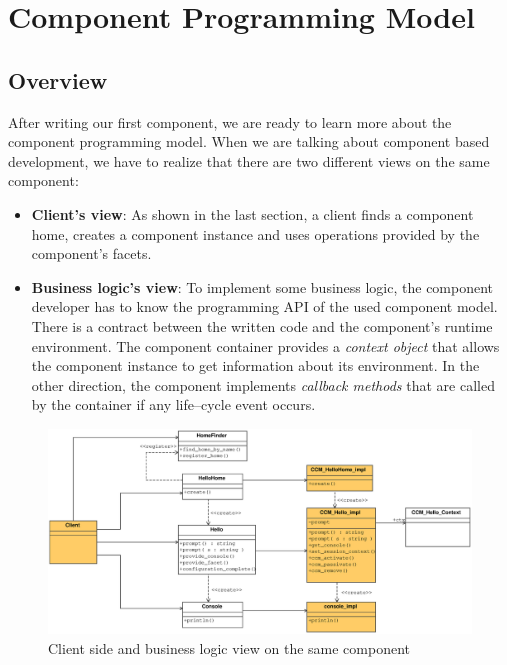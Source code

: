 
\chapter{Component Programming Model}

\section{Overview}

After writing our first component, we are ready to learn more about the 
component programming model.
When we are talking about component based development, we have to realize that there 
are two different views on the same component:
\begin{itemize}
\item {\bf Client's view}: As shown in the last section, a client finds a component 
home, creates a component instance and uses operations provided by the component's facets.

\item {\bf Business logic's view}: To implement some business logic, the component
developer has to know the programming API of the used component model.
There is a contract between the written code and the component's runtime environment.
The component container provides a {\it context object} that allows the component
instance to get information about its environment. In the other direction, the
component implements {\it callback methods} that are called by the container if any
life--cycle event occurs.
\end{itemize}

\begin{figure}[htbp]
    \begin{center}
        \includegraphics [width=12cm,angle=0] {uml/ComponentViews.eps}
        \caption{Client side and business logic view on the same component}
        \label{fig:ComponentViews}
    \end{center}
\end{figure}


